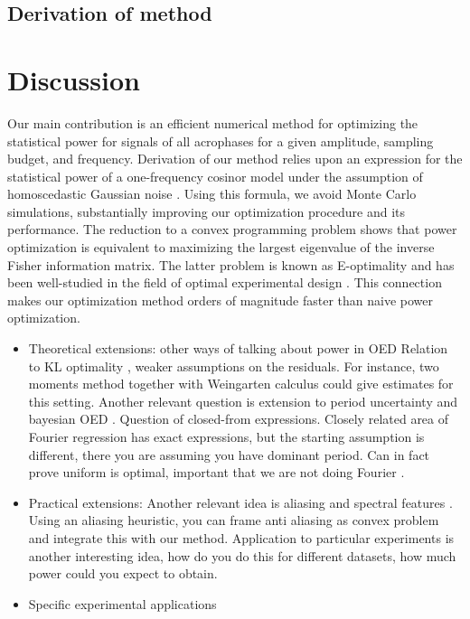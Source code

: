 \subsection{Derivation of method}

\section{Discussion}
Our main contribution is an efficient numerical method for optimizing the statistical power for signals of all acrophases  for a given amplitude, sampling budget, and frequency. Derivation of our method relies upon an expression for the statistical power of a one-frequency cosinor model under the assumption of homoscedastic Gaussian noise \cite{wei2023circpower}. Using this formula, we avoid Monte Carlo simulations, substantially improving our optimization procedure and its performance.  The reduction to a convex programming problem shows that power optimization is equivalent to maximizing the largest eigenvalue of the inverse Fisher information matrix. The latter problem is known as E-optimality and has been well-studied in the field of optimal experimental design \cite{pukelsheim1993,oed2,oed3}. This connection makes our  optimization method orders of magnitude faster than naive power optimization. 
\begin{itemize}
    \item Theoretical extensions: other ways of talking about power in OED Relation to KL optimality \cite{KLpaper}, weaker assumptions on the residuals. For instance, two moments method \cite{wasserman2022} together with Weingarten calculus could give estimates for this setting. Another relevant question is extension to period uncertainty and bayesian OED \cite{bayesian}. Question of closed-from expressions. Closely related area of Fourier regression \cite{dette1,dette2} has exact expressions, but the starting assumption is different, there you are assuming you have dominant period. Can in fact prove uniform is optimal, important that we are not doing Fourier \cite{fourierEoptimality}. 
    \item Practical extensions: Another relevant idea is aliasing and spectral features \cite{stoica2009}. Using an aliasing heuristic, you can frame anti aliasing as convex problem and integrate this with our method. Application to particular experiments is another interesting idea, how do you do this for different datasets, how much power could you expect to obtain. 
    \item Specific experimental applications
\end{itemize}
